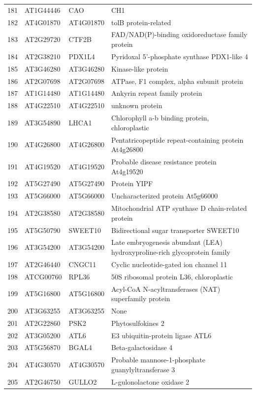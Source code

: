 \documentclass[11pt]{article}
\begin{document}
\begin{center}
\begin{tabular}{rlll}
181 & AT1G44446 & CAO & CH1\\
182 & AT4G01870 & AT4G01870 & tolB protein-related\\
183 & AT2G29720 & CTF2B & FAD/NAD(P)-binding oxidoreductase family protein\\
184 & AT2G38210 & PDX1L4 & Pyridoxal 5'-phosphate synthase PDX1-like 4\\
185 & AT3G46280 & AT3G46280 & Kinase-like protein\\
186 & AT2G07698 & AT2G07698 & ATPase, F1 complex, alpha subunit protein\\
187 & AT1G14480 & AT1G14480 & Ankyrin repeat family protein\\
188 & AT4G22510 & AT4G22510 & unknown protein\\
189 & AT3G54890 & LHCA1 & Chlorophyll a-b binding protein, chloroplastic\\
190 & AT4G26800 & AT4G26800 & Pentatricopeptide repeat-containing protein At4g26800\\
191 & AT4G19520 & AT4G19520 & Probable disease resistance protein At4g19520\\
192 & AT5G27490 & AT5G27490 & Protein YIPF\\
193 & AT5G66000 & AT5G66000 & Uncharacterized protein At5g66000\\
194 & AT2G38580 & AT2G38580 & Mitochondrial ATP synthase D chain-related protein\\
195 & AT5G50790 & SWEET10 & Bidirectional sugar transporter SWEET10\\
196 & AT3G54200 & AT3G54200 & Late embryogenesis abundant (LEA) hydroxyproline-rich glycoprotein family\\
197 & AT2G46440 & CNGC11 & Cyclic nucleotide-gated ion channel 11\\
198 & ATCG00760 & RPL36 & 50S ribosomal protein L36, chloroplastic\\
199 & AT5G16800 & AT5G16800 & Acyl-CoA N-acyltransferases (NAT) superfamily protein\\
200 & AT3G63255 & AT3G63255 & None\\
201 & AT2G22860 & PSK2 & Phytosulfokines 2\\
202 & AT3G05200 & ATL6 & E3 ubiquitin-protein ligase ATL6\\
203 & AT5G56870 & BGAL4 & Beta-galactosidase 4\\
204 & AT4G30570 & AT4G30570 & Probable mannose-1-phosphate guanylyltransferase 3\\
205 & AT2G46750 & GULLO2 & L-gulonolactone oxidase 2\\

\end{tabular}
\end{center}
\end{document}
